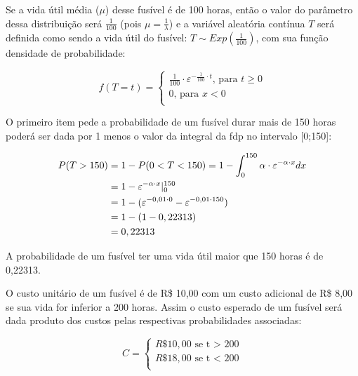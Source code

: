 \documentclass[
]{book}
\begin{document}
\hfill\break

Se a vida útil média (\(\mu\)) desse fusível é de 100 horas, então o valor do parâmetro dessa distribuição será \(\frac{1}{100}\) (pois \(\mu=\frac{1}{\lambda}\)) e a variável aleatória contínua \(T\) será definida como sendo a vida útil do fusível: \(T \sim Exp (\frac{1}{100})\), com sua função densidade de probabilidade:

\hfill\break

\[
f(T=t)=
\begin{cases}
    \frac{1}{100} \cdot \varepsilon ^{-  \frac{1}{100} \cdot t} \text{, para } t \ge 0 \\
    0 \text{, para } x < 0\\
\end{cases}
\]

O primeiro item pede a probabilidade de um fusível durar mais de 150 horas poderá ser dada por 1 menos o valor da integral da fdp no intervalo {[}0;150{]}:

\hfill\break

\begin{align*}
P( T > 150) & = 1 - P(0<T<150) = 1- \int_{0}^{150}  \alpha \cdot \varepsilon ^{- \alpha \cdot x} dx \\
            & = 1 - \varepsilon^{-\alpha \cdot x} \rvert_{0}^{150} \\
            & = 1 - (\varepsilon^{- 0,01 \cdot 0} - \varepsilon^{-0,01 \cdot 150}) \\
            & = 1 - (1  - 0,22313) \\
            & = 0,22313 \newline
\end{align*}

\hfill\break

A probabilidade de um fusível ter uma vida útil maior que 150 horas é de 0,22313.

\hfill\break

O custo unitário de um fusível é de R\$ 10,00 com um custo adicional de R\$ 8,00 se sua vida for inferior a 200 horas. Assim o custo esperado de um fusível será dada produto dos custos pelas respectivas probabilidades associadas:

\[
C=
\begin{cases}
R\$ 10,00 \text{ se t > 200}\\
R\$ 18,00 \text{ se t < 200}\\
\end{cases}
\]

\hfill\break
\end{document}
